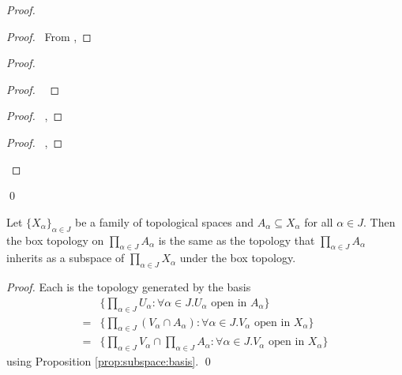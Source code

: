 \begin{proof}
  \pf
  \begin{proof}
    \pf\ From , 
  \end{proof}
  \begin{proof}
    \begin{proof}
      \pf\ 
    \end{proof}
    \begin{proof}
      \pf\ , 
    \end{proof}
    \begin{proof}
      \pf\ , 
    \end{proof}
  \end{proof}
  \qed
\end{proof}

\begin{prop}
  Let $\{ X_\alpha \}_{\alpha \in J}$ be a family of topological spaces and $A_\alpha \subseteq X_\alpha$ for all $\alpha \in J$. Then the box topology on $\prod_{\alpha \in J} A_\alpha$ is the same as the topology that $\prod_{\alpha \in J} A_\alpha$ inherits as a subspace of $\prod_{\alpha \in J} X_\alpha$ under the box topology.
\end{prop}

\begin{proof}
  \pf
  Each is the topology generated by the basis
  \begin{align*}
    & \{ \prod_{\alpha \in J} U_\alpha : \forall \alpha \in J. U_\alpha \text{ open in } A_\alpha \}  \\
    = & \{ \prod_{\alpha \in J} (V_\alpha \cap A_\alpha) : \forall \alpha \in J. V_\alpha \text{ open in } X_\alpha \} \\
    = & \{ \prod_{\alpha \in J} V_\alpha \cap \prod_{\alpha \in J} A_\alpha : \forall \alpha \in J. V_\alpha \text{ open in } X_\alpha \}
  \end{align*}
  using Proposition \ref{prop:subspace:basis}. \qed
\end{proof}

